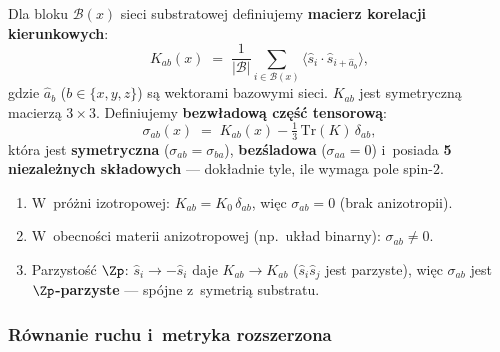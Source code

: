 \begin{definition}\label{def:sigma-ab}
Dla bloku $\mathcal{B}(x)$ sieci substratowej definiujemy
\textbf{macierz korelacji kierunkowych}:
\begin{equation}\label{eq:K-ab}
  K_{ab}(x) \;=\;
  \frac{1}{|\mathcal{B}|}\sum_{i\in\mathcal{B}(x)}
  \langle\hat{s}_i\cdot\hat{s}_{i+\hat{a}_b}\rangle,
\end{equation}
gdzie $\hat{a}_b$ ($b \in \{x,y,z\}$) s\k{a} wektorami
bazowymi sieci. $K_{ab}$ jest symetryczn\k{a} macierz\k{a}
$3{\times}3$. Definiujemy \textbf{bezw\l{}adow\k{a}
cz\k{e}\'s\'c tensorow\k{a}}:
\begin{equation}\label{eq:sigma-def}
  \boxed{
    \sigma_{ab}(x)
    \;=\; K_{ab}(x) - \tfrac{1}{3}\,\mathrm{Tr}(K)\,\delta_{ab},
  }
\end{equation}
kt\'ora jest \textbf{symetryczna} ($\sigma_{ab} = \sigma_{ba}$),
\textbf{bez\'sladowa} ($\sigma_{aa} = 0$) i~posiada
\textbf{5 niezale\.znych sk\l{}adowych}
--- dok\l{}adnie tyle, ile wymaga pole spin-$2$.
\end{definition}

\begin{remark}
\begin{enumerate}[nosep]
  \item W~pr\'o\.zni izotropowej:
    $K_{ab} = K_0\,\delta_{ab}$, wi\k{e}c
    $\sigma_{ab} = 0$ (brak anizotropii).
  \item W~obecno\'sci materii anizotropowej
    (np.\ uk\l{}ad binarny): $\sigma_{ab} \neq 0$.
  \item Parzysto\'s\'c $\Zp$:
    $\hat{s}_i \to -\hat{s}_i$ daje
    $K_{ab} \to K_{ab}$ ($\hat{s}_i\hat{s}_j$ jest
    parzyste), wi\k{e}c $\sigma_{ab}$ jest
    \textbf{$\Zp$-parzyste} --- sp\'ojne
    z~symetri\k{a} substratu.
\end{enumerate}
\end{remark}

\subsubsection{R\'ownanie ruchu i~metryka rozszerzona}


